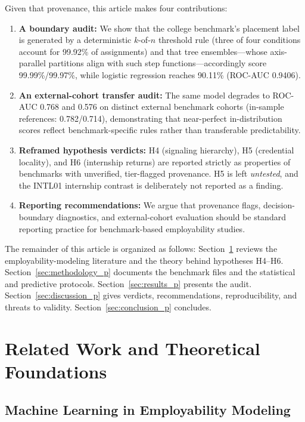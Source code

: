 \documentclass[journal]{IEEEtran}
\begin{document}
Given that provenance, this article makes four contributions:
\begin{enumerate}
    \item \textbf{A boundary audit:} We show that the college benchmark's placement label is generated by a deterministic $k$-of-$n$ threshold rule (three of four conditions account for 99.92\% of assignments) and that tree ensembles---whose axis-parallel partitions align with such step functions---accordingly score 99.99\%/99.97\%, while logistic regression reaches 90.11\% (ROC-AUC 0.9406).
    \item \textbf{An external-cohort transfer audit:} The same model degrades to ROC-AUC 0.768 and 0.576 on distinct external benchmark cohorts (in-sample references: 0.782/0.714), demonstrating that near-perfect in-distribution scores reflect benchmark-specific rules rather than transferable predictability.
    \item \textbf{Reframed hypothesis verdicts:} H4 (signaling hierarchy), H5 (credential locality), and H6 (internship returns) are reported strictly as properties of benchmarks with unverified, tier-flagged provenance. H5 is left \textit{untested}, and the INTL01 internship contrast is deliberately not reported as a finding.
    \item \textbf{Reporting recommendations:} We argue that provenance flags, decision-boundary diagnostics, and external-cohort evaluation should be standard reporting practice for benchmark-based employability studies.
\end{enumerate}

The remainder of this article is organized as follows: Section~\ref{sec:related_p} reviews the employability-modeling literature and the theory behind hypotheses H4--H6. Section~\ref{sec:methodology_p} documents the benchmark files and the statistical and predictive protocols. Section~\ref{sec:results_p} presents the audit. Section~\ref{sec:discussion_p} gives verdicts, recommendations, reproducibility, and threats to validity. Section~\ref{sec:conclusion_p} concludes.

\section{Related Work and Theoretical Foundations}
\label{sec:related_p}

\subsection{Machine Learning in Employability Modeling}
\end{document}
